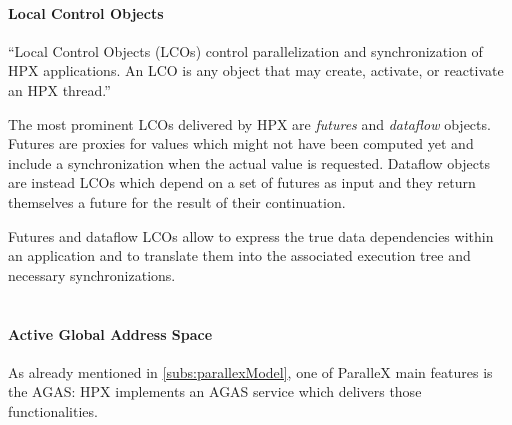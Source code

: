 \paragraph{Local Control Objects}
``Local Control Objects (LCOs) control parallelization and synchronization of
HPX applications. An LCO is any object that may create, activate, or reactivate
an HPX thread.''\cite{grubel2016dynamic}

The most prominent LCOs delivered by HPX are \emph{futures} and \emph{dataflow} objects. Futures are proxies for values which might not have been computed yet and include a synchronization when the actual value is requested. Dataflow objects are instead LCOs which depend on a set of futures as input and they return themselves a future for the result of their continuation.

Futures and dataflow LCOs allow to express the true data dependencies within an application and to translate them into the associated execution tree and necessary synchronizations.
~\\~

\paragraph{Active Global Address Space}
As already mentioned in \ref{subs:parallexModel}, one of ParalleX main features is the AGAS: HPX implements an AGAS service which delivers those functionalities.
~\\~

